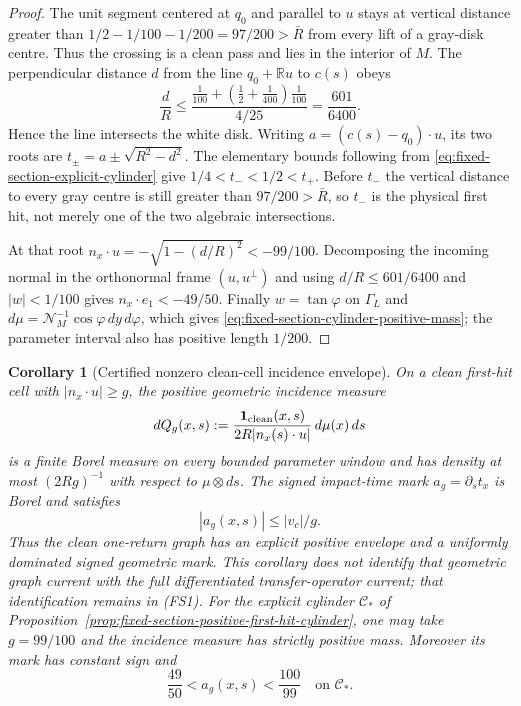 \documentclass[11pt]{article}
\newtheorem{corollary}[theorem]{Corollary}
\begin{document}
\begin{proof}
The unit segment centered at $q_0$ and parallel to $u$ stays at vertical
distance greater than
$1/2-1/100-1/200=97/200>\bar R$ from every lift of a gray-disk centre.
Thus the crossing is a clean pass and lies in the interior of $M$.  The
perpendicular distance $d$ from the line $q_0+\mathbb Ru$ to $c(s)$ obeys
\begin{equation}
 \frac dR\le
 \frac{\frac1{100}+(\frac12+\frac1{400})\frac1{100}}
      {4/25}
 =\frac{601}{6400}.
\label{eq:fixed-section-cylinder-distance}
\end{equation}
Hence the line intersects the white disk.  Writing
$a=(c(s)-q_0)\cdot u$, its two roots are
$t_\pm=a\pm\sqrt{R^2-d^2}$.  The elementary bounds following from
\eqref{eq:fixed-section-explicit-cylinder} give
$1/4<t_-<1/2<t_+$.  Before $t_-$ the vertical distance to every gray centre
is still greater than $97/200>\bar R$, so $t_-$ is the physical first hit,
not merely one of the two algebraic intersections.

At that root
$n_x\cdot u=-\sqrt{1-(d/R)^2}<-99/100$.  Decomposing the incoming normal
in the orthonormal frame $(u,u^\perp)$ and using
$d/R\le601/6400$ and $|w|<1/100$ gives
$n_x\cdot e_1<-49/50$.  Finally $w=\tan\varphi$ on $\Gamma_L$ and
$d\mu=\mathcal N_M^{-1}\cos\varphi\,dy\,d\varphi$, which gives
\eqref{eq:fixed-section-cylinder-positive-mass}; the parameter interval also
has positive length $1/200$.
\end{proof}

\begin{corollary}[Certified nonzero clean-cell incidence envelope]
\label{cor:fixed-section-clean-incidence-envelope}
On a clean first-hit cell with $|n_x\cdot u|\ge g$, the positive geometric incidence
measure
\[
 dQ_g(x,s):=
 \frac{\mathbf 1_{\rm clean}(x,s)}{2R|n_x(s)\cdot u|}\,d\mu(x)\,ds
\]
is a finite Borel measure on every bounded parameter window and has density at
most $(2Rg)^{-1}$ with respect to $\mu\otimes ds$.  The signed impact-time
mark $a_g=\partial_st_x$ is Borel and satisfies
\[
 |a_g(x,s)|\le |v_c|/g.
\]
Thus the clean one-return graph has an explicit positive envelope and a
uniformly dominated signed geometric mark.  This corollary does not identify
that geometric graph current with the full differentiated transfer-operator
current; that identification remains in \textup{(FS1)}.
For the explicit cylinder $\mathcal C_*$ of
Proposition~\ref{prop:fixed-section-positive-first-hit-cylinder}, one may take
$g=99/100$ and the incidence measure has strictly positive mass.  Moreover
its mark has constant sign and
\begin{equation}
 \frac{49}{50}<a_g(x,s)<\frac{100}{99}
 \quad\text{on }\mathcal C_*.
\label{eq:fixed-section-cylinder-mark-bounds}
\end{equation}
\end{corollary}
\end{document}
